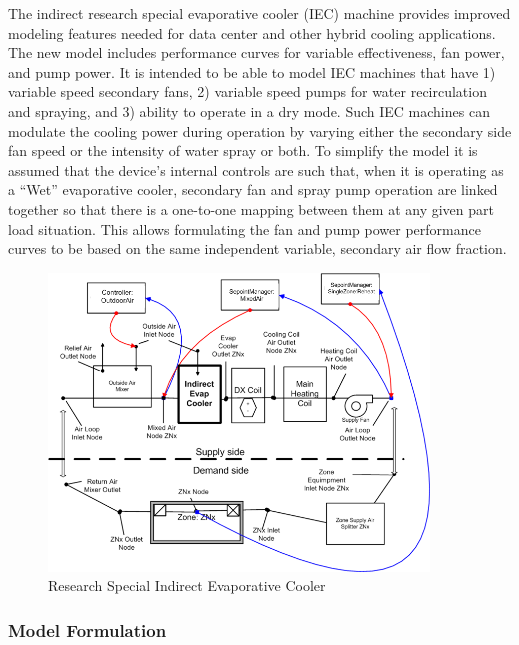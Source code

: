 The indirect research special evaporative cooler (IEC) machine provides improved modeling features needed for data center and other hybrid cooling applications. The new model includes performance curves for variable effectiveness, fan power, and pump power. It is intended to be able to model IEC machines that have 1) variable speed secondary fans, 2) variable speed pumps for water recirculation and spraying, and 3) ability to operate in a dry mode. Such IEC machines can modulate the cooling power during operation by varying either the secondary side fan speed or the intensity of water spray or both. To simplify the model it is assumed that the device's internal controls are such that, when it is operating as a ``Wet'' evaporative cooler, secondary fan and spray pump operation are linked together so that there is a one-to-one mapping between them at any given part load situation. This allows formulating the fan and pump power performance curves to be based on the same independent variable, secondary air flow fraction.

\begin{figure}[hbtp] %
\centering
\includegraphics[width=0.9\textwidth, height=0.9\textheight, keepaspectratio=true]{media/image4808.png}
\caption{Research Special Indirect Evaporative Cooler \protect \label{fig:research-special-indirect-evaporative-cooler}}
\end{figure}

\subsubsection{Model Formulation}\label{model-formulation}

